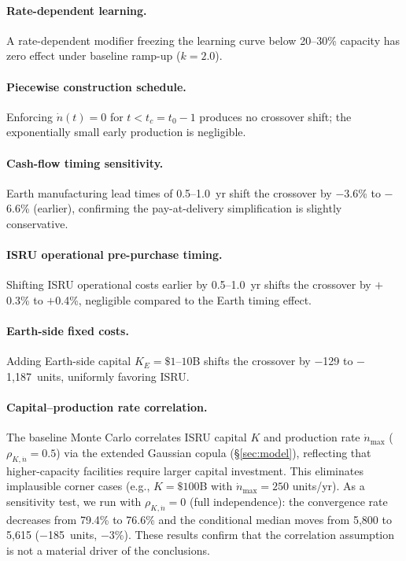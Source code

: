 \documentclass[preprint,12pt]{elsarticle}
\begin{document}
\paragraph{Rate-dependent learning.} A rate-dependent modifier freezing the learning curve below 20--30\% capacity has zero effect under baseline ramp-up ($k = 2.0$).

\paragraph{Piecewise construction schedule.} Enforcing $\dot{n}(t) = 0$ for $t < t_c = t_0 - 1$ produces no crossover shift; the exponentially small early production is negligible.

\paragraph{Cash-flow timing sensitivity.} Earth manufacturing lead times of 0.5--1.0~yr shift the crossover by $-$3.6\% to $-$6.6\% (earlier), confirming the pay-at-delivery simplification is slightly conservative.

\paragraph{ISRU operational pre-purchase timing.} Shifting ISRU operational costs earlier by 0.5--1.0~yr shifts the crossover by $+$0.3\% to $+$0.4\%, negligible compared to the Earth timing effect.

\paragraph{Earth-side fixed costs.} Adding Earth-side capital $K_E = \$1$--$10$B shifts the crossover by $-$129 to $-$1{,}187~units, uniformly favoring ISRU.

\paragraph{Capital--production rate correlation.} The baseline Monte Carlo correlates ISRU capital $K$ and production rate $\dot{n}_{\max}$ ($\rho_{K,\dot{n}} = 0.5$) via the extended Gaussian copula (\S\ref{sec:model}), reflecting that higher-capacity facilities require larger capital investment. This eliminates implausible corner cases (e.g., $K = \$100$B with $\dot{n}_{\max} = 250$ units/yr). As a sensitivity test, we run with $\rho_{K,\dot{n}} = 0$ (full independence): the convergence rate decreases from 79.4\% to 76.6\% and the conditional median moves from 5{,}800 to 5{,}615 ($-$185~units, $-$3\%). These results confirm that the correlation assumption is not a material driver of the conclusions.
\end{document}
